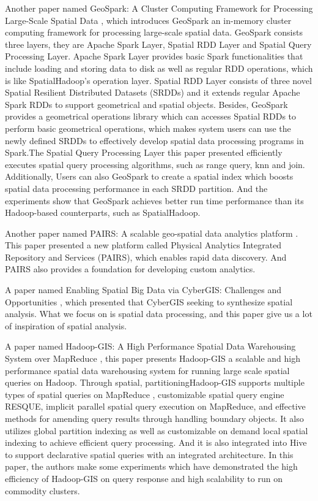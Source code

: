 Another paper named  GeoSpark: A Cluster Computing Framework for Processing Large-Scale Spatial Data \cite{yu2015geospark} , which introduces GeoSpark an in-memory cluster computing framework for processing large-scale spatial data. GeoSpark consists three layers, they are Apache Spark Layer, Spatial RDD Layer and Spatial Query Processing Layer. Apache Spark Layer provides basic Spark functionalities that include loading and storing data to disk as well as regular RDD operations, which is like SpatialHadoop's operation layer. Spatial RDD Layer consists of three novel Spatial Resilient Distributed Datasets (SRDDs) and it extends regular Apache Spark RDDs to support geometrical and spatial objects. Besides, GeoSpark provides a geometrical operations library which can accesses Spatial RDDs to perform basic geometrical operations, which makes system users can use the newly defined SRDDs to effectively develop spatial data processing programs in Spark.The Spatial Query Processing Layer this paper presented efficiently executes spatial query processing algorithms, such as range query, knn and join. Additionally, Users can also GeoSpark to create a spatial index which boosts spatial data processing performance in each SRDD partition. And the experiments show that GeoSpark achieves better run time performance than its Hadoop-based counterparts, such as SpatialHadoop. 


Another paper named PAIRS: A scalable geo-spatial data analytics platform \cite{klein2015pairs}. This paper presented a new platform called Physical Analytics Integrated Repository and Services (PAIRS), which enables rapid data discovery. And PAIRS also provides a foundation for developing custom analytics. 


A paper named Enabling Spatial Big Data via CyberGIS: Challenges and Opportunities \cite{evans2014enabling} , which presented that CyberGIS seeking to synthesize spatial analysis. What we focus on is spatial data processing, and this paper give us a lot of inspiration of spatial analysis.


A paper named Hadoop-GIS: A High Performance Spatial Data Warehousing System over MapReduce \cite{aji2013hadoop} , this paper presents Hadoop-GIS a scalable and high performance spatial data warehousing system for running large scale spatial queries on Hadoop. Through spatial,  partitioningHadoop-GIS supports multiple types of spatial queries on MapReduce , customizable spatial query engine RESQUE, implicit parallel spatial query execution on MapReduce, and effective methods for amending query results through handling boundary objects. It also utilizes global partition indexing as well as customizable on demand local spatial indexing to achieve efficient query processing. And it is also integrated into Hive to support declarative spatial queries with an integrated architecture. In this paper, the authors make some experiments which have demonstrated the high efficiency of Hadoop-GIS on query response and high scalability to run on commodity clusters. 


